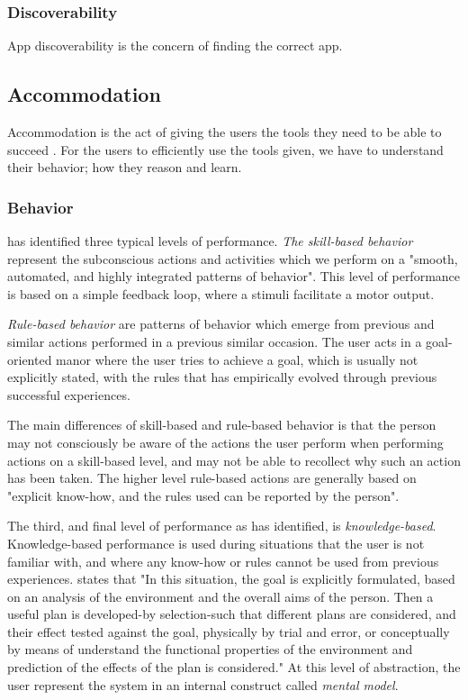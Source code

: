\subsubsection{Discoverability}
App discoverability is the concern of finding the correct app. 

\subsection{Accommodation}
Accommodation is the act of giving the users the tools they need to be able to succeed \cite{Bradt2009}. For the users to efficiently use the tools given, we have to understand their behavior; how they reason and learn.

\subsubsection{Behavior}
\cite{Rasmussen1983} has identified three typical levels of performance. \textit{The skill-based behavior} represent the subconscious actions and activities which we perform on a "smooth, automated, and highly integrated patterns of behavior". This level of performance is based on a simple feedback loop, where a stimuli facilitate a motor output. 

\textit{Rule-based behavior} are patterns of behavior which emerge from previous and similar actions performed in a previous similar occasion. The user acts in a goal-oriented manor where the user tries to achieve a goal, which is usually not explicitly stated, with the rules that has empirically evolved through previous successful experiences. 

The main differences of skill-based and rule-based behavior is that the person may not consciously be aware of the actions the user perform when performing actions on a skill-based level, and may not be able to recollect why such an action has been taken. The higher level rule-based actions are generally based on "explicit know-how, and the rules used can be reported by the person".

The third, and final level of performance as \cite{Rasmussen1983} has identified, is \textit{knowledge-based}. Knowledge-based performance is used during situations that the user is not familiar with, and where any know-how or rules cannot be used from previous experiences. \cite{Rasmussen1983} states that "In this situation, the goal is explicitly formulated, based on an analysis of the environment and the overall aims of the person. Then a useful plan is developed-by selection-such that different plans are considered, and their effect tested against the goal, physically by trial and error, or conceptually by means of understand the functional properties of the environment and prediction of the effects of the plan is considered." At this level of abstraction, the user represent the system in an internal construct called \textit{mental model}.

